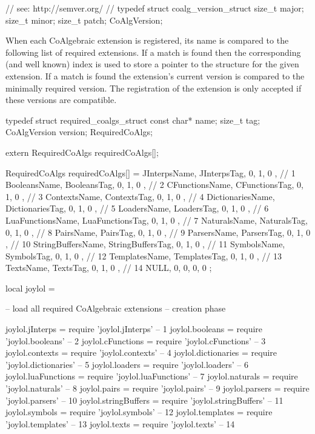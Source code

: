 \startCHeader
// see: http://semver.org/
//
typedef struct coalg_version_struct {
  size_t major;
  size_t minor;
  size_t patch;
} CoAlgVersion;
\stopCHeader

When each CoAlgebraic extension is registered, its name is compared to the 
following list of required extensions. If a match is found then the 
corresponding (and well known) index is used to store a pointer to the 
 structure for the given extension. If a match is found 
the extension's current version is compared to the minimally required 
version. The registration of the extension is only accepted if these 
versions are compatible. 

\startCHeader
typedef struct required_coalgs_struct {
  const char*  name;
  size_t       tag;
  CoAlgVersion version;
} RequiredCoAlgs;

extern RequiredCoAlgs requiredCoAlgs[];
\stopCHeader
{}

\startCCode
RequiredCoAlgs requiredCoAlgs[] = {
  { JInterpsName,      JInterpsTag,      {0, 1, 0 }}, //  1
  { BooleansName,      BooleansTag,      {0, 1, 0 }}, //  2
  { CFunctionsName,    CFunctionsTag,    {0, 1, 0 }}, //  3
  { ContextsName,      ContextsTag,      {0, 1, 0 }}, //  4
  { DictionariesName,  DictionariesTag,  {0, 1, 0 }}, //  5
  { LoadersName,       LoadersTag,       {0, 1, 0 }}, //  6
  { LuaFunctionsName,  LuaFunctionsTag,  {0, 1, 0 }}, //  7
  { NaturalsName,      NaturalsTag,      {0, 1, 0 }}, //  8
  { PairsName,         PairsTag,         {0, 1, 0 }}, //  9
  { ParsersName,       ParsersTag,       {0, 1, 0 }}, // 10
  { StringBuffersName, StringBuffersTag, {0, 1, 0 }}, // 11
  { SymbolsName,       SymbolsTag,       {0, 1, 0 }}, // 12
  { TemplatesName,     TemplatesTag,     {0, 1, 0 }}, // 13
  { TextsName,         TextsTag,         {0, 1, 0 }}, // 14
  { NULL,              0,                {0, 0, 0 }}
};
\stopCCode

\startLuaCode
local joylol = { }

-- load all required CoAlgebraic extensions -- creation phase

joylol.jInterps      = require 'joylol.jInterps'       --  1
joylol.booleans      = require 'joylol.booleans'       --  2
joylol.cFunctions    = require 'joylol.cFunctions'     --  3
joylol.contexts      = require 'joylol.contexts'       --  4
joylol.dictionaries  = require 'joylol.dictionaries'   --  5
joylol.loaders       = require 'joylol.loaders'        --  6
joylol.luaFunctions  = require 'joylol.luaFunctions'   --  7
joylol.naturals      = require 'joylol.naturals'       --  8
joylol.pairs         = require 'joylol.pairs'          --  9
joylol.parsers       = require 'joylol.parsers'        -- 10
joylol.stringBuffers = require 'joylol.stringBuffers'  -- 11
joylol.symbols       = require 'joylol.symbols'        -- 12
joylol.templates     = require 'joylol.templates'      -- 13
joylol.texts         = require 'joylol.texts'          -- 14

